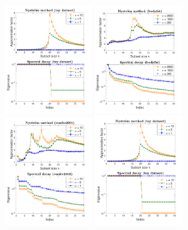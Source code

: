 \documentclass{article}
\begin{document}
\begin{figure}[t]
  \centering
  \ifisarxiv
  \includegraphics[width=0.345\textwidth]{figs/nystrom/rbf-toy-double}
   \hspace{-6mm}
  \includegraphics[width=0.345\textwidth]{figs/nystrom/rbf-bodyfat-double}
  \hspace{-6mm}
  \includegraphics[width=0.345\textwidth]{figs/nystrom/rbf-eunite2001-double}
  \vspace{-5mm}
  \else
    \includegraphics[width=0.35\textwidth]{figs/nystrom/rbf-toy-double}

\end{figure}
\end{document}
